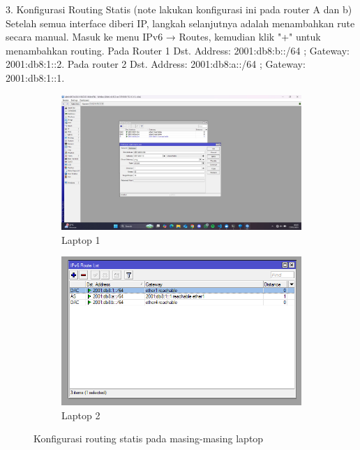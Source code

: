 3. Konfigurasi Routing Statis (note lakukan konfigurasi ini pada router A dan b) Setelah semua interface diberi IP, langkah selanjutnya adalah menambahkan rute secara manual. Masuk ke menu IPv6 → Routes, kemudian klik "+" untuk menambahkan routing. Pada Router 1 Dst. Address: 2001:db8:b::/64 ; Gateway: 2001:db8:1::2. Pada router 2 Dst. Address: 2001:db8:a::/64 ; Gateway: 2001:db8:1::1.
\begin{figure}[H]
    \centering
    \begin{subfigure}[b]{0.3\linewidth}
      \centering
      \includegraphics[width=\linewidth]{image/statis4.jpg}
      \caption{Laptop 1}
    \end{subfigure}
    \hspace{1cm}
    \begin{subfigure}[b]{0.3\linewidth}
      \centering
      \includegraphics[width=\linewidth]{image/statis3.png}
      \caption{Laptop 2}
    \end{subfigure}
    \caption{Konfigurasi routing statis pada masing-masing laptop}
\end{figure}
